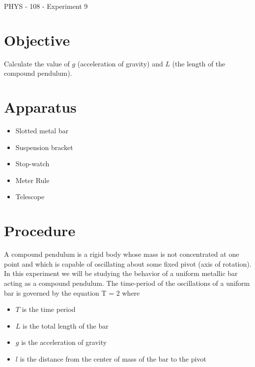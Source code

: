 \documentclass{article}
\begin{document}
   {\hfill PHYS - 108 - Experiment 9}\\


   \section*{Objective}
   
      Calculate the value of $g$ (acceleration of gravity) and $L$ (the length of the compound pendulum).


   \section*{Apparatus}

      \begin{itemize}

         \item Slotted metal bar
         \item Suspension bracket
         \item Stop-watch
         \item Meter Rule
         \item Telescope

      \end{itemize}


   \section*{Procedure}

      A compound pendulum is a rigid body whose mass is not concentrated at one point and which is capable of oscillating about some fixed pivot (axis of rotation). In this experiment we will be studying the behavior of a uniform metallic bar acting as a compound pendulum. The time-period of the oscillations of a uniform bar is governed by the equation
      \beq \label{eqn_T}
         T = 2 \pi {}
      \eeq
      where
      \begin{itemize}
         \item $T$ is the time period
         \item $L$ is the total length of the bar
         \item $g$ is the acceleration of gravity
         \item $l$ is the distance from the center of mass of the bar to the pivot
      \end{itemize}
\end{document}
